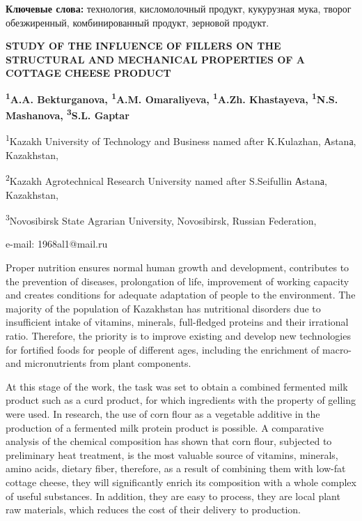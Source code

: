 {\bfseries Ключевые слова:} технология, кисломолочный продукт, кукурузная
мука, творог обезжиренный, комбинированный продукт, зерновой продукт.

\begin{articleheader}
{\bfseries STUDY OF THE INFLUENCE OF FILLERS ON THE STRUCTURAL AND MECHANICAL PROPERTIES OF A COTTAGE CHEESE PRODUCT}

{\bfseries
\textsuperscript{1}A.A. Bekturganova\textsuperscript{\envelope },
\textsuperscript{1}A.M. Omaraliyeva,
\textsuperscript{1}A.Zh. Khastayeva,
\textsuperscript{1}N.S. Mashanova,
\textsuperscript{3}S.L. Gaptar
}
\end{articleheader}

\begin{affiliation}
\textsuperscript{1}Kazakh University of Technology and Business named after K.Kulazhan, Аstanа, Kazakhstan,

\textsuperscript{2}Kazakh Agrotechnical Research University named after S.Seifullin Аstanа, Kazakhstan,

\textsuperscript{3}Novosibirsk State Agrarian University, Novosibirsk, Russian Federation,

e-mail: 1968al1@mail.ru
\end{affiliation}

Proper nutrition ensures normal human growth and development,
contributes to the prevention of diseases, prolongation of life,
improvement of working capacity and creates conditions for adequate
adaptation of people to the environment. The majority of the population
of Kazakhstan has nutritional disorders due to insufficient intake of
vitamins, minerals, full-fledged proteins and their irrational ratio.
Therefore, the priority is to improve existing and develop new
technologies for fortified foods for people of different ages, including
the enrichment of macro- and micronutrients from plant components.

At this stage of the work, the task was set to obtain a combined
fermented milk product such as a curd product, for which ingredients
with the property of gelling were used. In research, the use of corn
flour as a vegetable additive in the production of a fermented milk
protein product is possible. A comparative analysis of the chemical
composition has shown that corn flour, subjected to preliminary heat
treatment, is the most valuable source of vitamins, minerals, amino
acids, dietary fiber, therefore, as a result of combining them with
low-fat cottage cheese, they will significantly enrich its composition
with a whole complex of useful substances. In addition, they are easy to
process, they are local plant raw materials, which reduces the cost of
their delivery to production.

